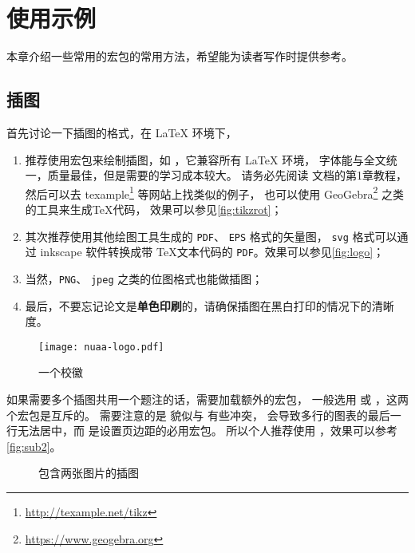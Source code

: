 \chapter{使用示例}

本章介绍一些常用的宏包的常用方法，希望能为读者写作时提供参考。

\section{插图}

首先讨论一下插图的格式，在 \LaTeX{} 环境下，
\begin{enumerate}
\item 推荐使用宏包来绘制插图，如 ，它兼容所有 \LaTeX{} 环境，
字体能与全文统一，质量最佳，但是需要的学习成本较大。
请务必先阅读  文档的第1章教程，
然后可以去 texample\footnote{\url{http://texample.net/tikz}} 等网站上找类似的例子，
也可以使用 GeoGebra\footnote{\url{https://www.geogebra.org}} 之类的工具来生成\TeX 代码，
效果可以参见\autoref{fig:tikzrot}；
\item 其次推荐使用其他绘图工具生成的 \verb|PDF|、 \verb|EPS| 格式的矢量图，
\verb|svg| 格式可以通过 inkscape 软件转换成带 \TeX{}文本代码的 \verb|PDF|。效果可以参见\autoref{fig:logo}；
\item 当然，\verb|PNG|、 \verb|jpeg| 之类的位图格式也能做插图；
\item 最后，不要忘记论文是\textbf{单色印刷}的，请确保插图在黑白打印的情况下的清晰度。
\end{enumerate}

\begin{figure}[!htb]
    \centering
    \texttt{[image: nuaa-logo.pdf]}
    \caption{一个校徽}
    \label{fig:logo}
\end{figure}

如果需要多个插图共用一个题注的话，需要加载额外的宏包，
一般选用  或 ，这两个宏包是互斥的。
需要注意的是  貌似与  有些冲突，
会导致多行的图表的最后一行无法居中，而  是设置页边距的必用宏包。
所以个人推荐使用  ，效果可以参考\autoref{fig:sub2}。

\begin{figure}[htb]
  \quad
  \caption{包含两张图片的插图}
  \label{fig:subfigs}
\end{figure}


